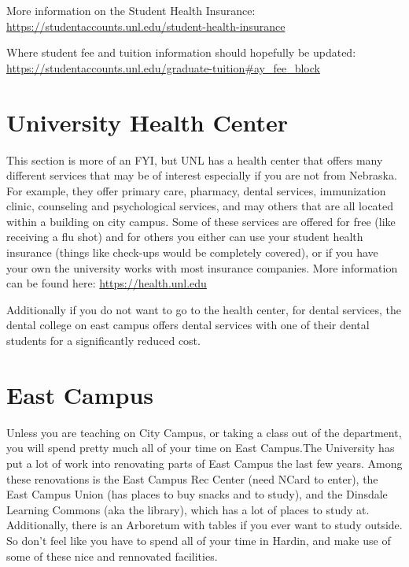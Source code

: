 \documentclass[
  12pt,
]{book}
\begin{document}
More information on the Student Health Insurance:
\url{https://studentaccounts.unl.edu/student-health-insurance}

Where student fee and tuition information should hopefully be updated: \url{https://studentaccounts.unl.edu/graduate-tuition\#ay_fee_block}

\hypertarget{university-health-center}{%
\section{University Health Center}\label{university-health-center}}

This section is more of an FYI, but UNL has a health center that offers many different services that may be of interest especially if you are not from Nebraska. For example, they offer primary care, pharmacy, dental services, immunization clinic, counseling and psychological services, and may others that are all located within a building on city campus. Some of these services are offered for free (like receiving a flu shot) and for others you either can use your student health insurance (things like check-ups would be completely covered), or if you have your own the university works with most insurance companies. More information can be found here: \url{https://health.unl.edu}

Additionally if you do not want to go to the health center, for dental services, the dental college on east campus offers dental services with one of their dental students for a significantly reduced cost.

\hypertarget{east-campus}{%
\section{East Campus}\label{east-campus}}

Unless you are teaching on City Campus, or taking a class out of the department, you will spend pretty much all of your time on East Campus.The University has put a lot of work into renovating parts of East Campus the last few years. Among these renovations is the East Campus Rec Center (need NCard to enter), the East Campus Union (has places to buy snacks and to study), and the Dinsdale Learning Commons (aka the library), which has a lot of places to study at. Additionally, there is an Arboretum with tables if you ever want to study outside. So don't feel like you have to spend all of your time in Hardin, and make use of some of these nice and rennovated facilities.
\end{document}
